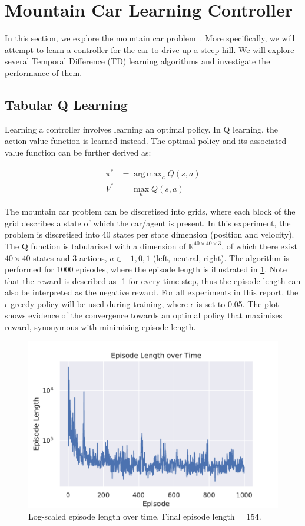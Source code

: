 \documentclass{article}
\DeclareMathOperator*{\argmax}{arg\,max}
\begin{document}
\section{Mountain Car Learning Controller}

In this section, we explore the mountain car problem~\cite{mooreEfficientMemorybasedLearning1990}. More specifically, we will attempt to learn a controller for the car to drive up a steep hill. We will explore several Temporal Difference (TD) learning algorithms and investigate the performance of them.

\subsection{Tabular Q Learning}

Learning a controller involves learning an optimal policy. In Q learning, the action-value function is learned instead. The optimal policy and its associated value function can be further derived as:

\begin{equation}
    \begin{split}
        \pi^* &= \argmax_{a} Q(s, a) \\
        V^* &= \max_{a} Q(s, a) 
    \end{split}
    \label{eq:optimal-V}
\end{equation}

The mountain car problem can be discretised into grids, where each block of the grid describes a state of which the car/agent is present. In this experiment, the problem is discretised into 40 states per state dimension (position and velocity). The Q function is tabularized with a dimension of $\mathbb{R}^{40 \times 40 \times 3}$, of which there exist $40 \times 40$ states and 3 actions, $a \in {-1, 0, 1}$ (left, neutral, right). The algorithm is performed for 1000 episodes, where the episode length is illustrated in \cref{fig:ep-length}. Note that the reward is described as -1 for every time step, thus the episode length can also be interpreted as the negative reward. For all experiments in this report, the $\epsilon$-greedy policy will be used during training, where $\epsilon$ is set to 0.05. The plot shows evidence of the convergence towards an optimal policy that maximises reward, synonymous with minimising episode length.

\begin{figure}
    \centering
    \includegraphics[width=.7\linewidth]{Figures/ep_length.pdf}
    \caption{Log-scaled episode length over time. Final episode length = 154.}
    \label{fig:ep-length}
\end{figure}
\end{document}
